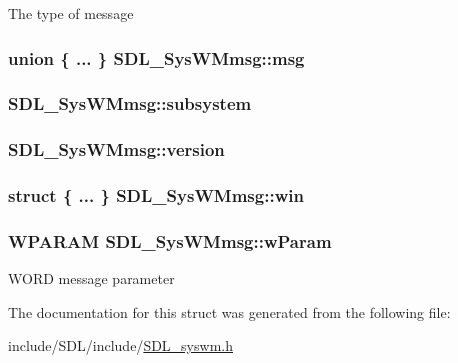 The type of message \hypertarget{struct_s_d_l___sys_w_mmsg_a8890abd547a386afa3a822f15568c162}{
\subsubsection[{msg}]{\setlength{\rightskip}{0pt plus 5cm}union \{ ... \}   S\-D\-L\-\_\-\-Sys\-W\-Mmsg\-::msg}}\label{struct_s_d_l___sys_w_mmsg_a8890abd547a386afa3a822f15568c162}
\hypertarget{struct_s_d_l___sys_w_mmsg_a7c3900af5ea797f1318fc77ee0ecd11b}{
\subsubsection[{subsystem}]{ S\-D\-L\-\_\-\-Sys\-W\-Mmsg\-::subsystem}}\label{struct_s_d_l___sys_w_mmsg_a7c3900af5ea797f1318fc77ee0ecd11b}
\hypertarget{struct_s_d_l___sys_w_mmsg_a95f9aae58d18ee8fac556416b322a5fb}{
\subsubsection[{version}]{ S\-D\-L\-\_\-\-Sys\-W\-Mmsg\-::version}}\label{struct_s_d_l___sys_w_mmsg_a95f9aae58d18ee8fac556416b322a5fb}
\hypertarget{struct_s_d_l___sys_w_mmsg_a4a2c604644a582e72fa86bca36b1b808}{
\subsubsection[{win}]{\setlength{\rightskip}{0pt plus 5cm}struct \{ ... \}   S\-D\-L\-\_\-\-Sys\-W\-Mmsg\-::win}}\label{struct_s_d_l___sys_w_mmsg_a4a2c604644a582e72fa86bca36b1b808}
\hypertarget{struct_s_d_l___sys_w_mmsg_a7463730478d90ebc031d83098f3f74fc}{
\subsubsection[{w\-Param}]{\setlength{\rightskip}{0pt plus 5cm}W\-P\-A\-R\-A\-M S\-D\-L\-\_\-\-Sys\-W\-Mmsg\-::w\-Param}}\label{struct_s_d_l___sys_w_mmsg_a7463730478d90ebc031d83098f3f74fc}
W\-O\-R\-D message parameter 

The documentation for this struct was generated from the following file\-:\begin{DoxyCompactItemize}
\item 
include/\-S\-D\-L/include/\hyperlink{_s_d_l__syswm_8h}{S\-D\-L\-\_\-syswm.\-h}\end{DoxyCompactItemize}
